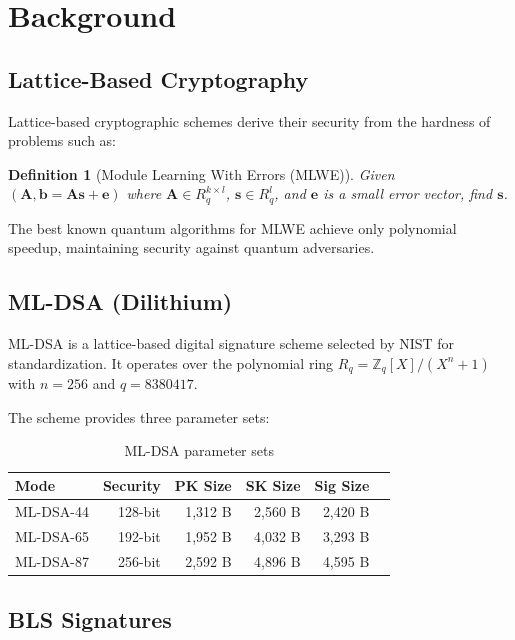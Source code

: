 \documentclass[11pt,a4paper]{article}
\newtheorem{definition}{Definition}
\begin{document}
\section{Background}

\subsection{Lattice-Based Cryptography}

Lattice-based cryptographic schemes derive their security from the hardness of problems such as:

\begin{definition}[Module Learning With Errors (MLWE)]
Given $(\mathbf{A}, \mathbf{b} = \mathbf{A}\mathbf{s} + \mathbf{e})$ where $\mathbf{A} \in R_q^{k \times l}$, $\mathbf{s} \in R_q^l$, and $\mathbf{e}$ is a small error vector, find $\mathbf{s}$.
\end{definition}

The best known quantum algorithms for MLWE achieve only polynomial speedup, maintaining security against quantum adversaries.

\subsection{ML-DSA (Dilithium)}

ML-DSA is a lattice-based digital signature scheme selected by NIST for standardization. It operates over the polynomial ring $R_q = \mathbb{Z}_q[X]/(X^n + 1)$ with $n = 256$ and $q = 8380417$.

The scheme provides three parameter sets:

\begin{table}[h]
\centering
\begin{tabular}{lrrrrr}
\toprule
\textbf{Mode} & \textbf{Security} & \textbf{PK Size} & \textbf{SK Size} & \textbf{Sig Size} \\
\midrule
ML-DSA-44 & 128-bit & 1,312 B & 2,560 B & 2,420 B \\
ML-DSA-65 & 192-bit & 1,952 B & 4,032 B & 3,293 B \\
ML-DSA-87 & 256-bit & 2,592 B & 4,896 B & 4,595 B \\
\bottomrule
\end{tabular}
\caption{ML-DSA parameter sets}
\end{table}

\subsection{BLS Signatures}
\end{document}
